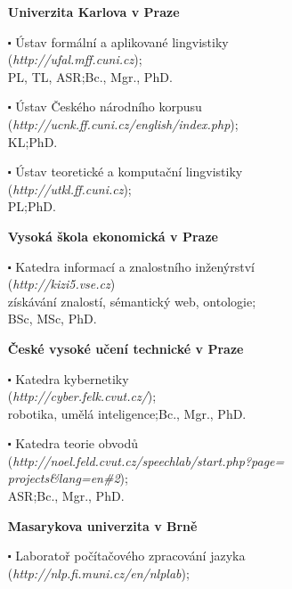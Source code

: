 \begin{multicols}{2}
\begin{itemize}
\item[]$\!\!\!\!\!\!$\textbf{Univerzita Karlova v Praze}
 \item[$\centerdot$]Ústav formální a aplikované lingvistiky\\
  (\textit{http://ufal.mff.cuni.cz});\\
  PL, TL, ASR;\hspace*{1em}Bc., Mgr., PhD.
 \item[$\centerdot$]Ústav Českého národního korpusu\\
  (\textit{http://ucnk.ff.cuni.cz/english/index.php});\\
  KL;\hspace*{1em}PhD.
 \item[$\centerdot$]Ústav teoretické a komputační lingvistiky\\
  (\textit{http://utkl.ff.cuni.cz});\\
  PL;\hspace*{1em}PhD.
\item[]$\!\!\!\!\!\!$\textbf{Vysoká škola ekonomická v Praze}
 \item[$\centerdot$]Katedra informací a znalostního inženýrství\\
  (\textit{http://kizi5.vse.cz})\\
  získávání znalostí, sémantický web, ontologie;\\BSc, MSc, PhD.
\item[]$\!\!\!\!\!\!$\textbf{České vysoké učení technické v Praze}
 \item[$\centerdot$]Katedra kybernetiky\\
  (\textit{http://cyber.felk.cvut.cz/});\\
  robotika, umělá inteligence;\hspace*{1em}Bc., Mgr., PhD.
 \item[$\centerdot$]Katedra teorie obvodů\\
  (\textit{http://noel.feld.cvut.cz/speechlab/start.php?page=\\\hspace*{2em}projects\&lang=en\#2});\\
  ASR;\hspace*{1em}Bc., Mgr., PhD.
\item[]$\!\!\!\!\!\!$\textbf{Masarykova univerzita v Brně}
 \item[$\centerdot$]Laboratoř počítačového zpracování jazyka\\
  (\textit{http://nlp.fi.muni.cz/en/nlplab});\\

\end{itemize}
\end{multicols}
